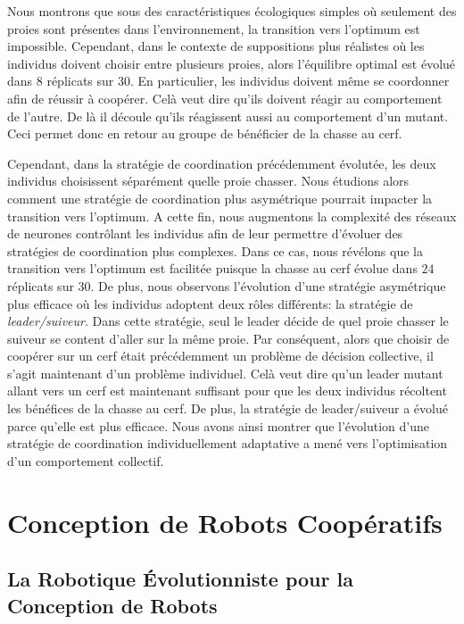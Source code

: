 			Nous montrons que sous des caractéristiques écologiques simples où seulement des proies sont présentes dans l'environnement, la transition vers l'optimum est impossible. Cependant, dans le contexte de suppositions plus réalistes où les individus doivent choisir entre plusieurs proies, alors l'équilibre optimal est évolué dans $8$ réplicats sur $30$. En particulier, les individus doivent même se coordonner afin de réussir à coopérer. Celà veut dire qu'ils doivent réagir au comportement de l'autre. De là il découle qu'ils réagissent aussi au comportement d'un mutant. Ceci permet donc en retour au groupe de bénéficier de la chasse au cerf.

			Cependant, dans la stratégie de coordination précédemment évolutée, les deux individus choisissent séparément quelle proie chasser. Nous étudions alors comment une stratégie de coordination plus asymétrique pourrait impacter la transition vers l'optimum. A cette fin, nous augmentons la complexité des réseaux de neurones contrôlant les individus afin de leur permettre d'évoluer des stratégies de coordination plus complexes. Dans ce cas, nous révélons que la transition vers l'optimum est facilitée puisque la chasse au cerf évolue dans $24$ réplicats sur $30$. De plus, nous observons l'évolution d'une stratégie asymétrique plus efficace où les individus adoptent deux rôles différents: la stratégie de \emph{leader/suiveur}. Dans cette stratégie, seul le leader décide de quel proie chasser le suiveur se content d'aller sur la même proie. Par conséquent, alors que choisir de coopérer sur un cerf était précédemment un problème de décision collective, il s'agit maintenant d'un problème individuel. Celà veut dire qu'un leader mutant allant vers un cerf est maintenant suffisant pour que les deux individus récoltent les bénéfices de la chasse au cerf. De plus, la stratégie de leader/suiveur a évolué parce qu'elle est plus efficace. Nous avons ainsi montrer que l'évolution d'une stratégie de coordination individuellement adaptative a mené vers l'optimisation d'un comportement collectif.



\section{Conception de Robots Coopératifs}

	\subsection{La Robotique Évolutionniste pour la Conception de Robots}

